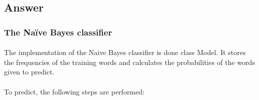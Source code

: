 \documentclass{article}
\begin{document}
\clearpage

\subsection*{Answer}

\subsubsection*{The Naïve Bayes classifier}

\paragraph{} The implementation of the Naive Bayes classifier is done class Model. It stores the frequencies of the training words and calculates the probabilities of the words given to predict.

\paragraph{} To predict, the following steps are performed:
\end{document}
